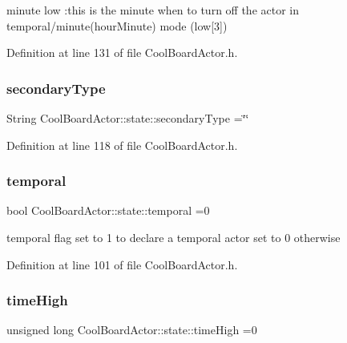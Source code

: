 minute low \+:this is the minute when to turn off the actor in temporal/minute(hour\+Minute) mode (low\mbox{[}3\mbox{]}) 

Definition at line 131 of file Cool\+Board\+Actor.\+h.

\mbox{\label{struct_cool_board_actor_1_1state_a44e8f69868f2491b79ed075f84aa0fcb}} 
\subsubsection{\texorpdfstring{secondary\+Type}{secondaryType}}
{\footnotesize\ttfamily String Cool\+Board\+Actor\+::state\+::secondary\+Type =\char`\"{}\char`\"{}}



Definition at line 118 of file Cool\+Board\+Actor.\+h.

\mbox{\label{struct_cool_board_actor_1_1state_a6442a8c3a30abc48472f3e5284b786ea}} 
\subsubsection{\texorpdfstring{temporal}{temporal}}
{\footnotesize\ttfamily bool Cool\+Board\+Actor\+::state\+::temporal =0}

temporal flag set to 1 to declare a temporal actor set to 0 otherwise 

Definition at line 101 of file Cool\+Board\+Actor.\+h.

\mbox{\label{struct_cool_board_actor_1_1state_a54cd4976b56aeaa6274fe0576aaebb0f}} 
\subsubsection{\texorpdfstring{time\+High}{timeHigh}}
{\footnotesize\ttfamily unsigned long Cool\+Board\+Actor\+::state\+::time\+High =0}



